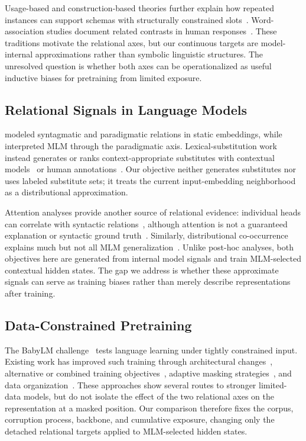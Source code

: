 \documentclass[11pt,a4paper]{article}
\begin{document}
Usage-based and construction-based theories further explain how
repeated instances can support schemas with structurally constrained
slots~\cite{tomasello2003constructing,bybee2010language,goldberg2006constructions}.
Word-association studies document related contrasts in human
responses~\cite{brown1960word,ervin1961changes,entwisle1964syntactic}.
These traditions motivate the relational axes, but our continuous
targets are model-internal approximations rather than symbolic
linguistic structures. The unresolved question is whether both axes
can be operationalized as useful inductive biases for pretraining from
limited exposure.

\subsection{Relational Signals in Language Models}

\citet{sun2015learning} modeled syntagmatic and paradigmatic relations
in static embeddings, while \citet{mickus2024language} interpreted MLM
through the paradigmatic axis. Lexical-substitution work instead
generates or ranks context-appropriate substitutes with contextual
models~\cite{melamud2016context2vec,zhou2019bertbased} or human
annotations~\cite{lee2021swords}. Our objective neither generates
substitutes nor uses labeled substitute sets; it treats the current
input-embedding neighborhood as a distributional approximation.

Attention analyses provide another source of relational evidence:
individual heads can correlate with syntactic
relations~\cite{clark2019what}, although attention is not a guaranteed
explanation or syntactic ground truth~\cite{jain2019attention}.
Similarly, distributional co-occurrence explains much but not all MLM
generalization~\cite{sinha2021masked,chiang2023distributional}. Unlike
post-hoc analyses, both objectives here are generated from internal
model signals and train MLM-selected contextual hidden states. The gap
we address is whether these approximate signals can serve as training
biases rather than merely describe representations after training.

\subsection{Data-Constrained Pretraining}

The BabyLM challenge~\cite{warstadt2023findings,hu2024babylm,charpentier2025findings}
tests language learning under tightly constrained input. Existing work
has improved such training through architectural
changes~\cite{huebner2021babyberta}, alternative or combined training
objectives~\cite{charpentier2024gpt}, adaptive masking
strategies~\cite{edman2025mask}, and data
organization~\cite{haga2024babylm}. These approaches show several
routes to stronger limited-data models, but do not isolate the effect
of the two relational axes on the representation at a masked position.
Our comparison therefore fixes the corpus, corruption process,
backbone, and cumulative exposure, changing only the detached
relational targets applied to MLM-selected hidden states.
\end{document}
